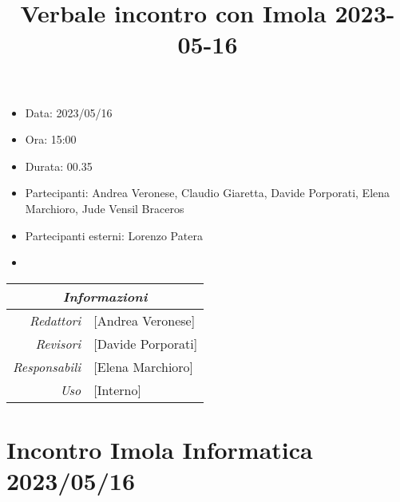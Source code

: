 \documentclass[12pt]{article}
\begin{document}
\graphicspath{ {../../templates/img} }

\title{Verbale incontro con Imola 2023-05-16}
\firstPage
\maketitle

\begin{center}
    \begin{itemize}
        \item[] Data: 2023/05/16
        \item[] Ora: 15:00
        \item[] Durata: 00.35
        \item[] Partecipanti: Andrea Veronese, Claudio Giaretta, Davide Porporati, Elena Marchioro, Jude Vensil Braceros
        \item[] Partecipanti esterni: Lorenzo Patera
        \item[] 
        \end{itemize}
    \begin{tabular}{r | l}
		\multicolumn{2}{c}{\textit{Informazioni}}\\
		\hline
			\textit{Redattori} &
			[Andrea Veronese]\makecell{}\\
			\textit{Revisori} &
			[Davide Porporati]\makecell{}\\
			\textit{Responsabili} &
			[Elena Marchioro]\makecell{}\\
		    \textit{Uso} & 
            [Interno]\makecell{}\\
\end{tabular}
\end{center}

\tableofcontents
\printindex
\section{Incontro Imola Informatica 2023/05/16}
\end{document}
